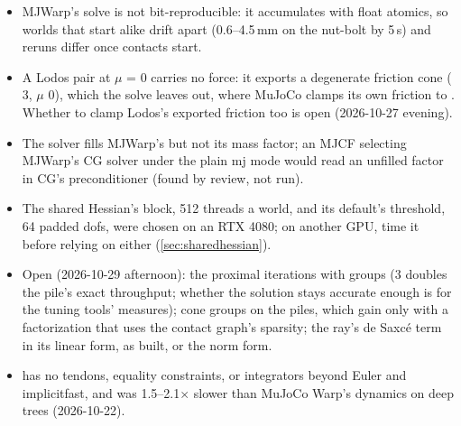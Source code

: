 \begin{itemize}
\item MJWarp's solve is not bit-reproducible: it accumulates with float atomics, so worlds that start alike drift apart (0.6--4.5\,mm on the nut-bolt by 5\,s) and reruns differ once contacts start.
\item A Lodos pair at $\mu$ = 0 carries no force: it exports a degenerate friction cone ( 3, $\mu$ 0), which the solve leaves out, where MuJoCo clamps its own friction to . Whether to clamp Lodos's exported friction too is open (2026-10-27 evening).
\item The solver fills MJWarp's  but not its mass factor; an MJCF selecting MJWarp's CG solver under the plain mj mode would read an unfilled factor in CG's preconditioner (found by review, not run).
\item The shared Hessian's block, 512 threads a world, and its default's threshold, 64 padded dofs, were chosen on an RTX 4080; on another GPU, time it before relying on either (\cref{sec:sharedhessian}).
\item Open (2026-10-29 afternoon): the proximal iterations with groups (3 doubles the pile's exact throughput; whether the solution stays accurate enough is for the tuning tools' measures); cone groups on the piles, which gain only with a factorization that uses the contact graph's sparsity; the ray's de Saxc\'e term in its linear form, as built, or the norm form.
\item {} has no tendons, equality constraints, or integrators beyond Euler and implicitfast, and was 1.5--2.1$\times$ slower than MuJoCo Warp's dynamics on deep trees (2026-10-22).
\end{itemize}

